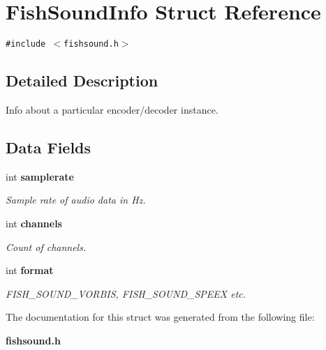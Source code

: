 \section{Fish\-Sound\-Info Struct Reference}
\label{structFishSoundInfo}
{\tt \#include $<$fishsound.h$>$}



\subsection{Detailed Description}
Info about a particular encoder/decoder instance. 

\subsection*{Data Fields}
\begin{CompactItemize}
\item 
int {\bf samplerate}\label{structFishSoundInfo_o0}

\begin{CompactList}\small\item\em Sample rate of audio data in Hz. \item\end{CompactList}\item 
int {\bf channels}\label{structFishSoundInfo_o1}

\begin{CompactList}\small\item\em Count of channels. \item\end{CompactList}\item 
int {\bf format}\label{structFishSoundInfo_o2}

\begin{CompactList}\small\item\em FISH\_\-SOUND\_\-VORBIS, FISH\_\-SOUND\_\-SPEEX etc. \item\end{CompactList}\end{CompactItemize}


The documentation for this struct was generated from the following file:\begin{CompactItemize}
\item 
{\bf fishsound.h}\end{CompactItemize}
